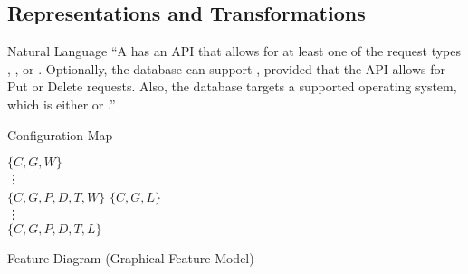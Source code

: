 \subsection{Representations and Transformations}

\begin{frame}[label=FeatureModelRepresentations]{\myframetitle}
	\begin{mycolumns}[b]
		\begin{example}{Natural Language}
			\tiny ``A  has an API that allows for at least one of the request types , , or .
			Optionally, the database can support , provided that the API allows for Put or Delete requests.
			Also, the database targets a supported operating system, which is either  or .''
		\end{example}
		\begin{example}{Configuration Map}
			\tiny
			\begin{mycolumns}[animation=none]
				$\{C,G,W\}$\\
				\hspace{4mm}\vdots\\[1ex]
				$\{C,G,P,D,T,W\}$
			\mynextcolumn
				$\{C,G,L\}$\\
				\hspace{4mm}\vdots\\[1ex]
				$\{C,G,P,D,T,L\}$
			\end{mycolumns}
		\end{example}
		\begin{exampletight}{Feature Diagram (Graphical Feature Model)}
			\centering\tiny
			\featureDiagramConfigurableDatabase
		\end{exampletight}
	\mynextcolumn
		\centering
		\sffamily
\end{mycolumns}
\end{frame}
